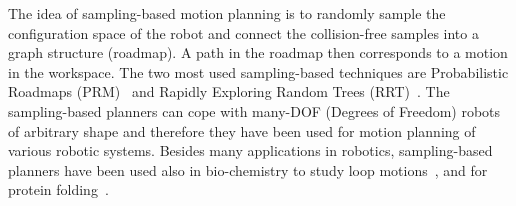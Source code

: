 \documentclass[usletter, 10pt, conference]{ieeeconf} %
\begin{document}
The idea of sampling-based motion planning is to randomly sample the configuration space of the robot and connect the collision-free samples
into a graph structure (roadmap).
A path in the roadmap then corresponds to a motion in the workspace.
The two most used sampling-based techniques are Probabilistic Roadmaps (PRM)~\cite{kavrakiForPP} and Rapidly Exploring Random Trees (RRT)~\cite{lavalleRRT}.
The sampling-based planners can cope with many-DOF (Degrees of Freedom) robots of arbitrary shape and therefore they have been used for motion planning of various robotic systems.
Besides many applications in robotics, sampling-based planners have been used also in bio-chemistry 
to study loop motions~\cite{cortes2004geometric},
and for protein folding~\cite{raveh2009rapid,novinskaya2015improving}.
\end{document}
